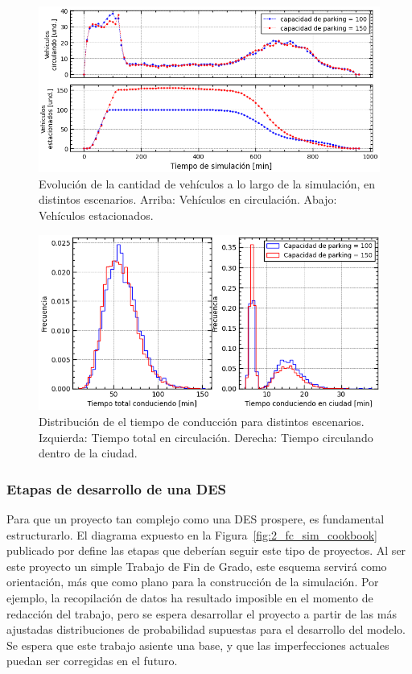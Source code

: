 \begin{figure}
	\begin{center}
		\includegraphics[width=\textwidth]{fig/2_fig_example_02}
	\end{center}
	\caption{Evolución de la cantidad de vehículos a lo largo de la simulación, en distintos escenarios. Arriba: Vehículos en circulación. Abajo: Vehículos estacionados.}
	\label{fig:2_fig_example_02}
\end{figure}

\begin{figure}
	\begin{center}
		\includegraphics[width=\textwidth]{fig/2_fig_example_03}
	\end{center}
	\caption{Distribución de el tiempo de conducción para distintos escenarios. Izquierda: Tiempo total en circulación. Derecha: Tiempo circulando dentro de la ciudad.}
	\label{fig:2_fig_example_03}
\end{figure}

\subsubsection{Etapas de desarrollo de una DES}

Para que un proyecto tan complejo como una DES prospere, es fundamental estructurarlo.
El diagrama expuesto en la Figura~\ref{fig:2_fc_sim_cookbook} publicado por \citep{banks1998handbook}
define las etapas que deberían seguir este tipo de proyectos.
Al ser este proyecto un simple Trabajo de Fin de Grado,
este esquema servirá como orientación, más que como plano para la construcción de la simulación.
Por ejemplo, la recopilación de datos ha resultado imposible en el momento de redacción del trabajo,
pero se espera desarrollar el proyecto
a partir de las más ajustadas distribuciones de probabilidad supuestas para el desarrollo del modelo.
Se espera que este trabajo asiente una base,
y que las imperfecciones actuales puedan ser corregidas en el futuro.

